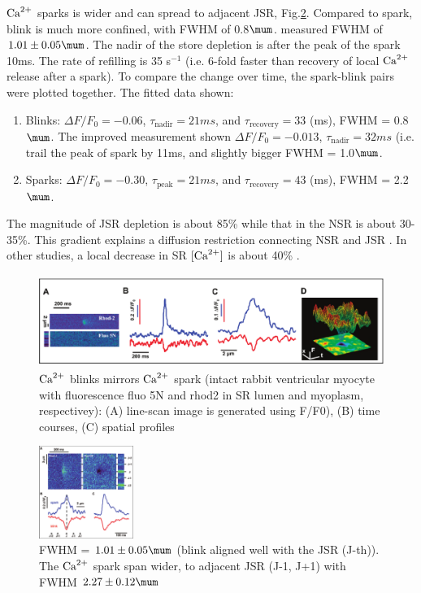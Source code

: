 ${\text{Ca}^{2+}}$ sparks is wider and can spread to adjacent JSR,
Fig.\ref{fig:spark_blink_brochet11}. Compared to spark, blink is much more
confined, with FWHM of 0.8$\mum$.
\citep{brochet2011} measured FWHM of $1.01\pm 0.05\mum$. The nadir of the store
depletion is after the peak of the spark 10ms. The rate of refilling is 35
s$^{-1}$ (i.e. 6-fold faster than recovery of local ${\text{Ca}^{2+}}$ release after a
spark). To compare the change over time, the spark-blink pairs were plotted
together. The fitted data shown:
\begin{enumerate}
  \item Blinks: $\Delta F/F_0 = -0.06$, $\tau_\text{nadir} = 21ms$, and
$\tau_\text{recovery} = 33$ (ms), FWHM = 0.8$\mum$. The improved measurement
shown $\Delta F/F_0 = -0.013$,  $\tau_\text{nadir} = 32ms$ (i.e. trail the peak
of spark by 11ms, and slightly bigger FWHM = 1.0$\mum$.
\item Sparks: $\Delta F/F_0 = -0.30$, $\tau_\text{peak} = 21ms$, and
$\tau_\text{recovery} = 43$ (ms), FWHM = 2.2$\mum$.
\end{enumerate}

The magnitude of JSR depletion is about 85\% while that in the NSR is about 30-35\%.
This gradient explains a diffusion restriction connecting NSR and JSR
\citep{cheng2008cs}. In other studies, a local decrease in SR $[{\text{Ca}^{2+}}]$ is about
40\% \citep{brochet2005, zima2008tcas}. 

\begin{figure}[hbt]
  \centerline{\includegraphics[height=3cm,
    angle=0]{./images/ca_blink_cheng08.eps}}
  \caption{${\text{Ca}^{2+}}$ blinks mirrors ${\text{Ca}^{2+}}$ spark (intact rabbit ventricular
  myocyte with fluorescence fluo 5N and rhod2 in SR lumen and myoplasm,
  respectivey): (A) line-scan image is generated using F/F0), (B) time courses,
  (C) spatial profiles }
\label{fig:ca_blink_cheng08}
\end{figure}


\begin{figure}[hbt]
  \centerline{\includegraphics[height=3cm,
    angle=0]{./images/spark_blink_brochet11.eps}}
  \caption{FWHM = $1.01\pm 0.05\mum$ (blink aligned well with the JSR (J-th)).
  The ${\text{Ca}^{2+}}$ spark span wider, to adjacent JSR (J-1, J+1) with FWHM $2.27\pm
  0.12\mum$}
\label{fig:spark_blink_brochet11}
\end{figure}

